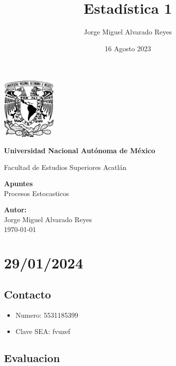\documentclass{article}
\title{Estadística 1}
\author{Jorge Miguel Alvarado Reyes}
\date{16 Agosto 2023}
\begin{document}
\begin{titlepage}
    \begin{center}
        \includegraphics[width=0.2\textwidth]{../unam.png}
        \vspace*{.5cm}

        \LARGE
        \textbf{Universidad Nacional Autónoma de México}

        \vspace{0.5cm}
        \LARGE
        Facultad de Estudios Superiores Acatlán

        \vspace{2cm}

        \textbf{Apuntes} \\
        Procesos Estocasticos

        \vfill

        \vspace{1cm}

        \textbf{\large Autor:} \\
        Jorge Miguel Alvarado Reyes \\
        \vspace{.5cm}
        \normalsize \today

    \end{center}
\end{titlepage}
\newpage

\tableofcontents

\newpage

\section{29/01/2024}

\subsection{Contacto}

\begin{itemize}
    \item Numero: 5531185399
    \item Clave SEA: fvuzef
\end{itemize}

\subsection{Evaluacion}
\end{document}
